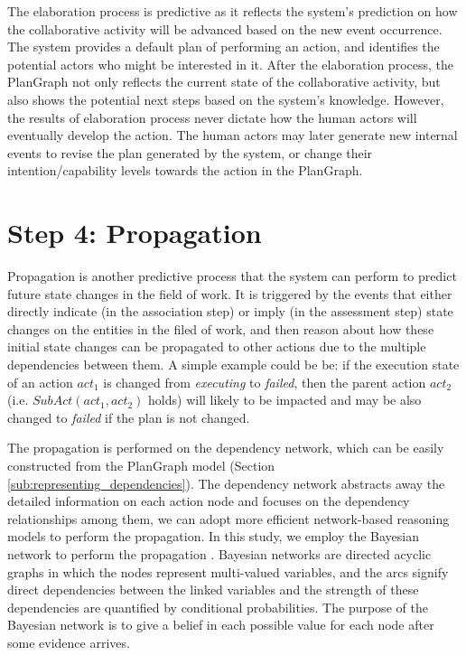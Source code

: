 The elaboration process is predictive as it reflects the system's prediction on how the collaborative activity will be advanced based on the new event occurrence. The system provides a default plan of performing an action, and identifies the potential actors who might be interested in it. After the elaboration process, the PlanGraph not only reflects the current state of the collaborative activity, but also shows the potential next steps based on the system's knowledge. However, the results of elaboration process never dictate how the human actors will eventually develop the action. The human actors may later generate new internal events to revise the plan generated by the system, or change their intention/capability levels towards the action in the PlanGraph.

\section{Step 4: Propagation} %
\label{sec:step_4_propagation}
Propagation is another predictive process that the system can perform to predict future state changes in the field of work. It is triggered by the events that either directly indicate (in the association step) or imply (in the assessment step) state changes on the entities in the filed of work, and then reason about how these initial state changes can be propagated to other actions due to the multiple dependencies between them. A simple example could be be: if the execution state of an action $act_1$ is changed from \emph{executing} to \emph{failed}, then the parent action $act_2$ (i.e. $SubAct(act_1, act_2)$ holds) will likely to be impacted and may be also changed to \emph{failed} if the plan is not changed. 

The propagation is performed on the dependency network, which can be easily constructed from the PlanGraph model (Section \ref{sub:representing_dependencies}). The dependency network abstracts away the detailed information on each action node and focuses on the dependency relationships among them, we can adopt more efficient network-based reasoning models to perform the propagation. In this study, we employ the Bayesian network to perform the propagation \cite{pearl1988probabilistic}. Bayesian networks are directed acyclic graphs in which the nodes represent multi-valued variables, and the arcs signify direct dependencies between the linked variables and the strength of these dependencies are quantified by conditional probabilities. The purpose of the Bayesian network is to give a belief in each possible value for each node after some evidence arrives.

